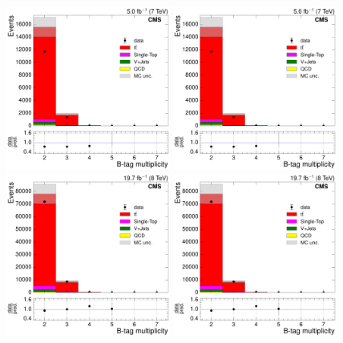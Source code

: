 \begin{figure}[H]
    \centering
      \includegraphics[width=0.48\textwidth]{Chapters/04_Analysis/04b_XSections/images/control_plots/before_fit/7TeV/MuPlusJets_N_BJets_with_ratio}\hfill
      \includegraphics[width=0.48\textwidth]{Chapters/04_Analysis/04b_XSections/images/control_plots/before_fit/7TeV/MuPlusJets_N_BJets_reweighted_with_ratio}\\
      \includegraphics[width=0.48\textwidth]{Chapters/04_Analysis/04b_XSections/images/control_plots/before_fit/8TeV/MuPlusJets_N_BJets_with_ratio}\hfill
      \includegraphics[width=0.48\textwidth]{Chapters/04_Analysis/04b_XSections/images/control_plots/before_fit/8TeV/MuPlusJets_N_BJets_reweighted_with_ratio}\\

\end{figure}
